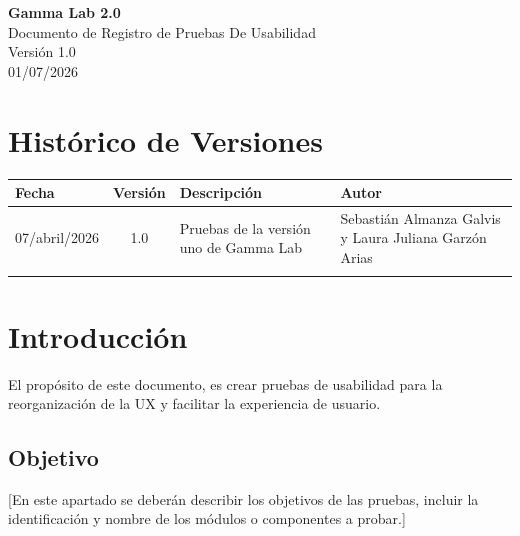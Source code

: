\documentclass[12pt,letterpaper]{article}
\begin{document}
\thispagestyle{empty}
\begin{center}
  \vspace*{4cm}
  {\Huge \textbf{Gamma Lab 2.0}}\\[1.5cm]
  {\LARGE Documento de Registro de Pruebas De Usabilidad}\\[2cm]
  {\Large Versión 1.0}\\[1cm]
  {\Large 01/07/2026}
  \vfill
\end{center}
\newpage

\section*{Histórico de Versiones}

\begin{tabularx}{\textwidth}{|l|c|X|X|}
  \hline
  \textbf{Fecha} & \textbf{Versión} & \textbf{Descripción} & \textbf{Autor} \\
  \hline
  07/abril/2026 & 1.0 & Pruebas de la versión uno de Gamma Lab &
    Sebastián Almanza Galvis y Laura Juliana Garzón Arias \\
  \hline
   & & & \\
  \hline
\end{tabularx}

\newpage

\tableofcontents
\newpage


\section{Introducción}

El propósito de este documento, es crear pruebas de usabilidad para la reorganización de la UX y facilitar la experiencia de usuario.

\subsection{Objetivo}

[En este apartado se deberán describir los objetivos de las pruebas, incluir la identificación y nombre de los módulos o componentes a probar.]
\end{document}
